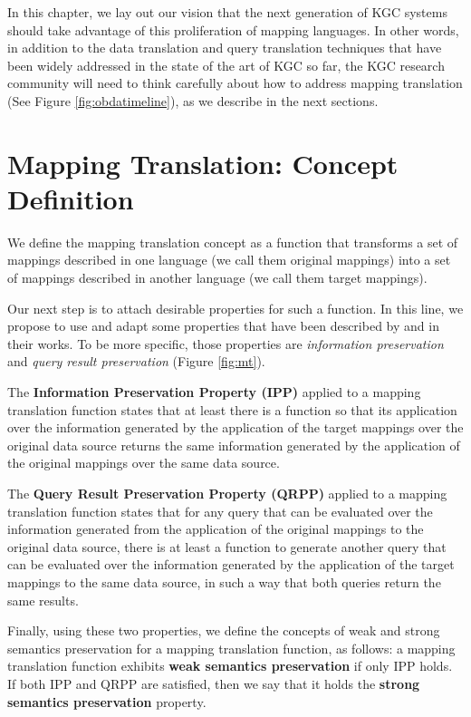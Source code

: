 In this chapter, we lay out our vision that the next generation of KGC systems should take advantage of this proliferation of mapping languages. In other words, in addition to the data translation and query translation techniques that have been widely addressed in the state of the art of KGC so far, the KGC research community will need to think carefully about how to address mapping translation (See Figure \ref{fig:obdatimeline}), as we describe in the next sections.


\section{Mapping Translation: Concept Definition}
We define the mapping translation concept as a function that transforms a set of mappings described in one language (we call them original mappings) into a set of mappings described in another language (we call them target mappings). 

Our next step is to attach desirable properties for such a function. In this line, we propose to use and adapt some properties that have been described by \citep{sequeda2012directly} and \citep{hartig2017foundations} in their works. To be more specific, those properties are \textit{information preservation} and \textit{query result preservation} (Figure \ref{fig:mt}).

The \textbf{Information Preservation Property (IPP)} applied to a mapping translation function states that at least there is a function so that its application over the information generated by the application of the target mappings over the original data source returns the same information generated by the application of the original mappings over the same data source.

The \textbf{Query Result Preservation Property (QRPP)} applied to a mapping translation function states that for any query that can be evaluated over the information generated from the application of the original mappings to the original data source, there is at least a function to generate another query that can be evaluated over the information generated by the application of the target mappings to the same data source, in such a way that both queries return the same results.


Finally, using these two properties, we define the concepts of weak and strong semantics preservation for a mapping translation function, as follows: a mapping translation function exhibits \textbf{weak semantics preservation} if only IPP holds. If both IPP and QRPP are satisfied, then we say that it holds the \textbf{strong semantics preservation} property.



